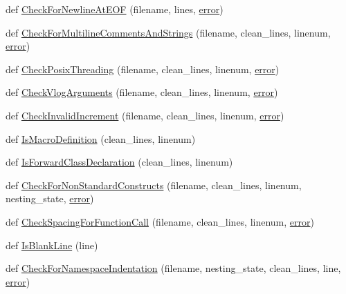 \begin{DoxyCompactItemize}
\item 
def \hyperlink{namespacecpplint_a7a594af230939932174dd5743088027d}{Check\+For\+Newline\+At\+E\+OF} (filename, lines, \hyperlink{_07copy_08_2_read_camera_model_8m_ac546fdc9911f4a876dbfaffbc7426f8b}{error})
\item 
def \hyperlink{namespacecpplint_a81c4baf76bde576f56661c22d01e470d}{Check\+For\+Multiline\+Comments\+And\+Strings} (filename, clean\+\_\+lines, linenum, \hyperlink{_07copy_08_2_read_camera_model_8m_ac546fdc9911f4a876dbfaffbc7426f8b}{error})
\item 
def \hyperlink{namespacecpplint_a9c406c00843a2c47058b1e9dec4e5b11}{Check\+Posix\+Threading} (filename, clean\+\_\+lines, linenum, \hyperlink{_07copy_08_2_read_camera_model_8m_ac546fdc9911f4a876dbfaffbc7426f8b}{error})
\item 
def \hyperlink{namespacecpplint_ab066834feaa7bf5a92982bbfb0af89c1}{Check\+Vlog\+Arguments} (filename, clean\+\_\+lines, linenum, \hyperlink{_07copy_08_2_read_camera_model_8m_ac546fdc9911f4a876dbfaffbc7426f8b}{error})
\item 
def \hyperlink{namespacecpplint_a8b47da46bc61f72ab12e9228acc3a0cd}{Check\+Invalid\+Increment} (filename, clean\+\_\+lines, linenum, \hyperlink{_07copy_08_2_read_camera_model_8m_ac546fdc9911f4a876dbfaffbc7426f8b}{error})
\item 
def \hyperlink{namespacecpplint_a5a95ee1e23638e172a3361723503329c}{Is\+Macro\+Definition} (clean\+\_\+lines, linenum)
\item 
def \hyperlink{namespacecpplint_adde7d60b6354b40d9ef9acda6e847d7b}{Is\+Forward\+Class\+Declaration} (clean\+\_\+lines, linenum)
\item 
def \hyperlink{namespacecpplint_a954b179c4037e5da8ac599cce095c37e}{Check\+For\+Non\+Standard\+Constructs} (filename, clean\+\_\+lines, linenum, nesting\+\_\+state, \hyperlink{_07copy_08_2_read_camera_model_8m_ac546fdc9911f4a876dbfaffbc7426f8b}{error})
\item 
def \hyperlink{namespacecpplint_a2ea8b2c917d5ce466287e1c6fe26f0db}{Check\+Spacing\+For\+Function\+Call} (filename, clean\+\_\+lines, linenum, \hyperlink{_07copy_08_2_read_camera_model_8m_ac546fdc9911f4a876dbfaffbc7426f8b}{error})
\item 
def \hyperlink{namespacecpplint_adf59429f3dd145e978624fe239809260}{Is\+Blank\+Line} (line)
\item 
def \hyperlink{namespacecpplint_a7c5964127d06521a2a05fbb28cc26478}{Check\+For\+Namespace\+Indentation} (filename, nesting\+\_\+state, clean\+\_\+lines, line, \hyperlink{_07copy_08_2_read_camera_model_8m_ac546fdc9911f4a876dbfaffbc7426f8b}{error})

\end{DoxyCompactItemize}
